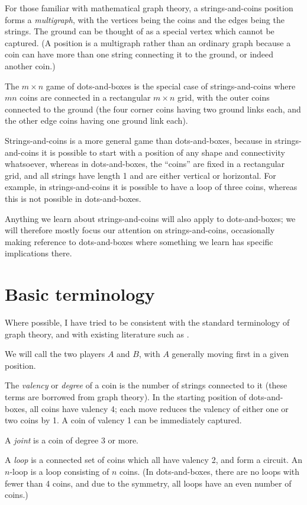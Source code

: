 \documentclass[a4paper,twocolumn]{article}
\begin{document}
For those familiar with mathematical graph theory, a strings-and-coins
position forms a \emph{multigraph}, with the vertices being the coins
and the edges being the strings. The ground can be thought of as a
special vertex which cannot be captured. (A position is a multigraph
rather than an ordinary graph because a coin can have more than one
string connecting it to the ground, or indeed another coin.)

The $m \times n$ game of dots-and-boxes is the special case of
strings-and-coins where $mn$ coins are connected in a rectangular $m
\times n$ grid, with the outer coins connected to the ground (the four
corner coins having two ground links each, and the other edge coins
having one ground link each).

Strings-and-coins is a more general game than dots-and-boxes, because
in strings-and-coins it is possible to start with a position of any
shape and connectivity whatsoever, whereas in dots-and-boxes, the
``coins'' are fixed in a rectangular grid, and all strings have length
1 and are either vertical or horizontal. For example, in
strings-and-coins it is possible to have a loop of three coins,
whereas this is not possible in dots-and-boxes.

Anything we learn about strings-and-coins will also apply to
dots-and-boxes; we will therefore mostly focus our attention on
strings-and-coins, occasionally making reference to dots-and-boxes
where something we learn has specific implications there.

\section{Basic terminology}

Where possible, I have tried to be consistent with the standard
terminology of graph theory, and with existing literature such as
\cite{berl}.

We will call the two players $A$ and $B$, with $A$ generally moving
first in a given position.

The \emph{valency} or \emph{degree} of a coin is the number of strings
connected to it (these terms are borrowed from graph theory). In the
starting position of dots-and-boxes, all coins have valency 4; each
move reduces the valency of either one or two coins by 1. A coin of
valency 1 can be immediately captured.

A \emph{joint} is a coin of degree 3 or more.

A \emph{loop} is a connected set of coins which all have valency 2, and
form a circuit. An $n$-loop is a loop consisting of $n$ coins. (In
dots-and-boxes, there are no loops with fewer than 4 coins, and due to
the symmetry, all loops have an even number of coins.)
\end{document}
